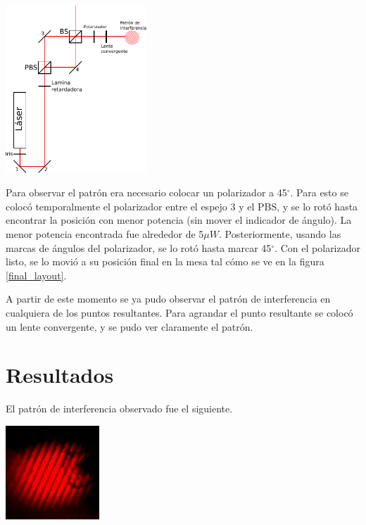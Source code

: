 \documentclass[twocolumn]{article}
\begin{document}
		\begin{center}
			\includegraphics[width=150pt]{img/layout.pdf}
			\label{final_layout}
		\end{center}

		Para observar el patrón era necesario colocar un polarizador a 45$^{\circ}$. Para esto se colocó temporalmente el polarizador entre el espejo 3 y el PBS, y se lo rotó hasta encontrar la posición con menor potencia (sin mover el indicador de ángulo). La menor potencia encontrada fue alrededor de 5$\mu W$. Posteriormente, usando las marcas de ángulos del polarizador, se lo rotó hasta marcar 45$^{\circ}$. Con el polarizador listo, se lo movió a su posición final en la mesa tal cómo se ve en la figura \ref{final_layout}.

		A partir de este momento se ya pudo observar el patrón de interferencia en cualquiera de los puntos resultantes. Para agrandar el punto resultante se colocó un lente convergente, y se pudo ver claramente el patrón.

	\section{Resultados}
		El patrón de interferencia observado fue el siguiente.

		\begin{center}
			\includegraphics[width=100pt]{img/interference.png}
			\label{interference}
		\end{center}
\end{document}

